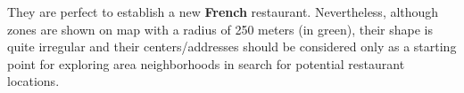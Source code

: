 \documentclass[11pt]{article}
\begin{document}

They are perfect to establish a new \textbf{French} restaurant.
Nevertheless, although zones are shown on map with a radius of 250
meters (in green), their shape is quite irregular and their
centers/addresses should be considered only as a starting point for
exploring area neighborhoods in search for potential restaurant
locations.
\end{document}
